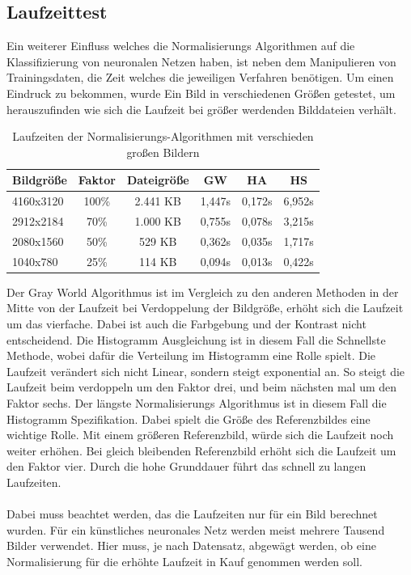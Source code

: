 \documentclass[a4paper,12pt,oneside]{article}
\begin{document}
\subsection{Laufzeittest}
Ein weiterer Einfluss welches die Normalisierungs Algorithmen auf die Klassifizierung von neuronalen Netzen haben, ist neben dem Manipulieren von Trainingsdaten, die Zeit welches die jeweiligen Verfahren benötigen. Um einen Eindruck zu bekommen, wurde Ein Bild in verschiedenen Größen getestet, um herauszufinden wie sich die Laufzeit bei größer werdenden Bilddateien verhält.
\begin{table}
[h]
\caption{Laufzeiten der Normalisierungs-Algorithmen mit verschieden großen Bildern}
\centering
\begin{tabular}{|l|c|c|c|c|c|}
\hline
Bildgröße & Faktor & Dateigröße & GW & HA & HS\\
\hline
4160x3120 & 100\% & 2.441 KB & 1,447s & 0,172s & 6,952s\\
2912x2184 & 70\% & 1.000 KB & 0,755s & 0,078s & 3,215s\\
2080x1560 & 50\% & 529 KB & 0,362s & 0,035s & 1,717s\\
1040x780 & 25\% & 114 KB & 0,094s & 0,013s & 0,422s\\
\hline
\end{tabular}
\end{table}
Der Gray World Algorithmus ist im Vergleich zu den anderen Methoden in der Mitte von der Laufzeit bei Verdoppelung der Bildgröße, erhöht sich die Laufzeit um das vierfache. Dabei ist auch die Farbgebung und der Kontrast nicht entscheidend. Die Histogramm Ausgleichung ist in diesem Fall die Schnellste Methode, wobei dafür die Verteilung im Histogramm eine Rolle spielt. Die Laufzeit verändert sich nicht Linear, sondern steigt exponential an. So steigt die Laufzeit beim verdoppeln um den Faktor drei, und beim nächsten mal um den Faktor sechs. Der längste Normalisierungs Algorithmus ist in diesem Fall die Histogramm Spezifikation. Dabei spielt die Größe des Referenzbildes eine wichtige Rolle. Mit einem größeren Referenzbild, würde sich die Laufzeit noch weiter erhöhen. Bei gleich bleibenden Referenzbild erhöht sich die Laufzeit um den Faktor vier. Durch die hohe Grunddauer führt das schnell zu langen Laufzeiten.\\\\
Dabei muss beachtet werden, das die Laufzeiten nur für ein Bild berechnet wurden. Für ein künstliches neuronales Netz werden meist mehrere Tausend Bilder verwendet. Hier muss, je nach Datensatz, abgewägt werden, ob eine Normalisierung für die erhöhte Laufzeit in Kauf genommen werden soll.   
\end{document}
